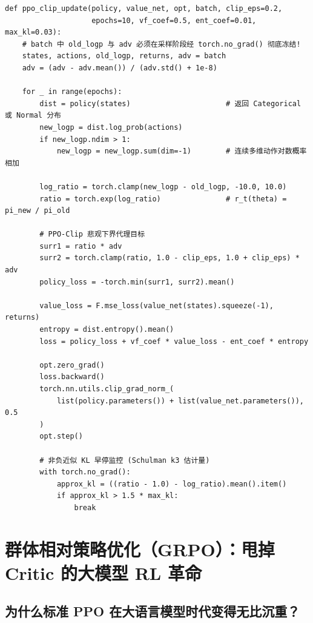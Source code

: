 \begin{lstlisting}[caption={PPO-Clip 多轮复用更新核心模块（支持连续高斯与离散策略的简洁 PyTorch 实现）}]
def ppo_clip_update(policy, value_net, opt, batch, clip_eps=0.2,
                    epochs=10, vf_coef=0.5, ent_coef=0.01, max_kl=0.03):
    # batch 中 old_logp 与 adv 必须在采样阶段经 torch.no_grad() 彻底冻结!
    states, actions, old_logp, returns, adv = batch
    adv = (adv - adv.mean()) / (adv.std() + 1e-8)

    for _ in range(epochs):
        dist = policy(states)                      # 返回 Categorical 或 Normal 分布
        new_logp = dist.log_prob(actions)
        if new_logp.ndim > 1:
            new_logp = new_logp.sum(dim=-1)        # 连续多维动作对数概率相加

        log_ratio = torch.clamp(new_logp - old_logp, -10.0, 10.0)
        ratio = torch.exp(log_ratio)               # r_t(theta) = pi_new / pi_old

        # PPO-Clip 悲观下界代理目标
        surr1 = ratio * adv
        surr2 = torch.clamp(ratio, 1.0 - clip_eps, 1.0 + clip_eps) * adv
        policy_loss = -torch.min(surr1, surr2).mean()

        value_loss = F.mse_loss(value_net(states).squeeze(-1), returns)
        entropy = dist.entropy().mean()
        loss = policy_loss + vf_coef * value_loss - ent_coef * entropy

        opt.zero_grad()
        loss.backward()
        torch.nn.utils.clip_grad_norm_(
            list(policy.parameters()) + list(value_net.parameters()), 0.5
        )
        opt.step()

        # 非负近似 KL 早停监控 (Schulman k3 估计量)
        with torch.no_grad():
            approx_kl = ((ratio - 1.0) - log_ratio).mean().item()
            if approx_kl > 1.5 * max_kl:
                break
\end{lstlisting}

\section{群体相对策略优化（GRPO）：甩掉 Critic 的大模型 RL 革命}
\label{sec:grpo}

\subsection{为什么标准 PPO 在大语言模型时代变得无比沉重？}

